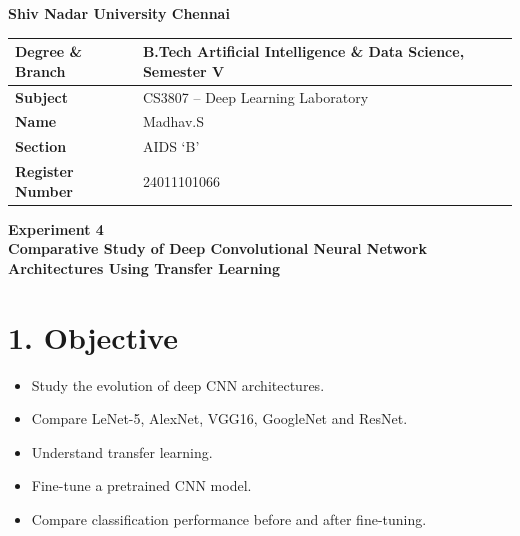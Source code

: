 \documentclass[11pt]{article}
\begin{document}
\begin{center}
{\LARGE\textbf{Shiv Nadar University Chennai}}\\[4mm]
\end{center}

\renewcommand{\arraystretch}{1.6}
\setlength{\tabcolsep}{10pt}

\begin{center}
\begin{tabular}{|p{4cm}|p{9.5cm}|}
\hline
\textbf{Degree \& Branch} & B.Tech Artificial Intelligence \& Data Science, Semester V \\ \hline
\textbf{Subject} & CS3807 -- Deep Learning Laboratory \\ \hline
\textbf{Name} & Madhav.S \\ \hline
\textbf{Section} & AIDS `B' \\ \hline
\textbf{Register Number} & 24011101066 \\ \hline
\end{tabular}
\end{center}

\vspace{5mm}

\begin{center}
{\Large\textbf{Experiment 4}}\\[1mm]
{\large\textbf{Comparative Study of Deep Convolutional Neural Network Architectures Using Transfer Learning}}
\end{center}

\vspace{4mm}


\section*{1. Objective}

\begin{itemize}[leftmargin=*]
\item Study the evolution of deep CNN architectures.
\item Compare LeNet-5, AlexNet, VGG16, GoogleNet and ResNet.
\item Understand transfer learning.
\item Fine-tune a pretrained CNN model.
\item Compare classification performance before and after fine-tuning.
\end{itemize}

\end{document}
